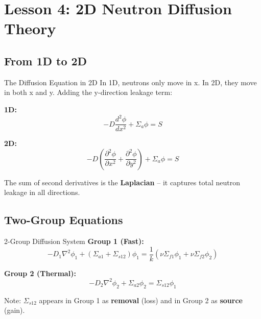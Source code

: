 \documentclass[12pt,a4paper]{article}
\begin{document}
\section{Lesson 4: 2D Neutron Diffusion Theory}

\subsection{From 1D to 2D}

\begin{physicsbox}{The Diffusion Equation in 2D}
In 1D, neutrons only move in x. In 2D, they move in both x and y.
Adding the y-direction leakage term:

\textbf{1D:}
\begin{equation}
-D \frac{d^2\phi}{dx^2} + \Sigma_a \phi = S
\end{equation}

\textbf{2D:}
\begin{equation}
-D\left(\frac{\partial^2\phi}{\partial x^2} +
        \frac{\partial^2\phi}{\partial y^2}\right) + \Sigma_a \phi = S
\end{equation}

The sum of second derivatives is the \textbf{Laplacian} -- it captures
total neutron leakage in all directions.
\end{physicsbox}

\subsection{Two-Group Equations}

\begin{physicsbox}{2-Group Diffusion System}
\textbf{Group 1 (Fast):}
\begin{equation}
-D_1\nabla^2\phi_1 + (\Sigma_{a1} + \Sigma_{s12})\phi_1
= \frac{1}{k}(\nu\Sigma_{f1}\phi_1 + \nu\Sigma_{f2}\phi_2)
\end{equation}

\textbf{Group 2 (Thermal):}
\begin{equation}
-D_2\nabla^2\phi_2 + \Sigma_{a2}\phi_2 = \Sigma_{s12}\phi_1
\end{equation}

Note: $\Sigma_{s12}$ appears in Group 1 as \textbf{removal} (loss) and
in Group 2 as \textbf{source} (gain).
\end{physicsbox}
\end{document}
